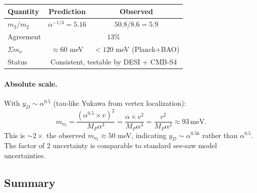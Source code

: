 \begin{center}
\begin{tabular}{lcc}
\toprule
\textbf{Quantity} & \textbf{Prediction} & \textbf{Observed} \\
\midrule
$m_3/m_2$ & $\alpha^{-1/3} = 5.16$ & $50.8/8.6 = 5.9$ \\
Agreement & \multicolumn{2}{c}{$13\%$} \\
\midrule
$\Sigma m_\nu$ & $\approx 60$ meV & $< 120$ meV (Planck+BAO) \\
Status & \multicolumn{2}{c}{Consistent, testable by DESI + CMB-S4} \\
\bottomrule
\end{tabular}
\end{center}

\paragraph{Absolute scale.}
With $y_D \sim \alpha^{0.5}$ (tau-like Yukawa from vertex localization):
\begin{equation}
m_{\nu_3} = \frac{(\alpha^{0.5} \times v)^2}{M_P\alpha^3} = \frac{\alpha \times v^2}{M_P\alpha^3} = \frac{v^2}{M_P\alpha^2} \approx 93\,\text{meV}.
\end{equation}
This is $\sim 2\times$ the observed $m_{\nu_3} \approx 50$ meV, indicating $y_D \sim \alpha^{0.56}$ rather than $\alpha^{0.5}$.
The factor of 2 uncertainty is comparable to standard see-saw model uncertainties.

\subsection{Summary}\label{sec:P_summary}

